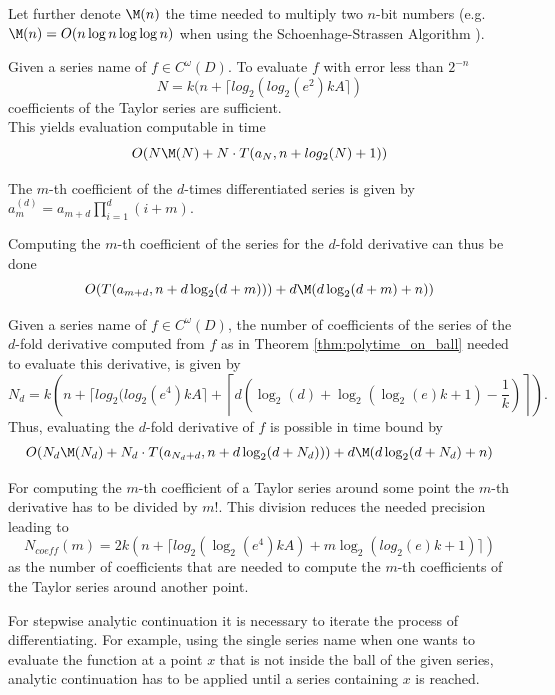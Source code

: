 		Let further denote $\M(n)$ the time needed to multiply two $n$-bit numbers (e.g. $\M(n) = O(n\log n \log \log n)$ when using the Schoenhage-Strassen Algorithm \cite{Schonhage1971}). 		
		\begin{theorem}
			Given a series name of $f \in C^\omega(D)$.
			To evaluate $f$ with error less than $2^{-n}$ 
			$$N = k(n+\lceil log_2(log_2 (e^2) kA \rceil)$$
			coefficients of the Taylor series are sufficient. \\
			This yields evaluation computable in time 
			$$ O(N\M(N)+N \cdot T(a_N, n+log_2(N)+1)) $$ 
		\end{theorem}

		\begin{theorem}
			The $m$-th coefficient of the $d$-times differentiated series is given by $a_m^{(d)} = a_{m+d} \prod_{i=1}^d (i+m)$.
			
			Computing the $m$-th coefficient of the series for the $d$-fold derivative can thus be done
			$$ O(T(a_{m+d}, n+d\log_2(d+m)))+d\M(d \log_2 (d+m)+n)) $$
		\end{theorem}

		\begin{theorem}
			Given a series name of $f \in C^\omega(D)$, the number of coefficients of the series of the $d$-fold derivative computed from $f$ as in Theorem \ref{thm:polytime_on_ball} needed to evaluate this derivative, is given by 
			$$N_d = k\left(n+\lceil log_2(log_2 (e^4) kA \rceil+\left \lceil d\left(\log_2(d)+\log_2(\log_2(e)k+1)-\frac{1}{k}\right)\right\rceil\right).$$
			Thus, evaluating the $d$-fold derivative of $f$ is possible in time bound by
			$$ O(N_d\M(N_d)+N_d \cdot T(a_{N_d+d}, n+d\log_2(d+N_d)))+d\M(d \log_2 (d+N_d)+n) $$ 
		\end{theorem}
		For computing the $m$-th coefficient of a Taylor series around some point the $m$-th derivative 
		has to be divided by $m!$. This division reduces the needed precision leading to 
		$$N_{coeff}(m) = 2k\left( n+\lceil log_2(\log_2 (e^4) kA) + m \log_2(log_2(e)k+1)\rceil \right)$$
		as the number of coefficients that are needed to compute the $m$-th coefficients of the Taylor series 
		around another point. 
    
		For stepwise analytic continuation it is necessary to iterate the process of differentiating.
		For example, using the single series name when one wants to evaluate the function at a point $x$
		that is not inside the ball of the given series, analytic continuation has to be applied until a series
		containing $x$ is reached.

